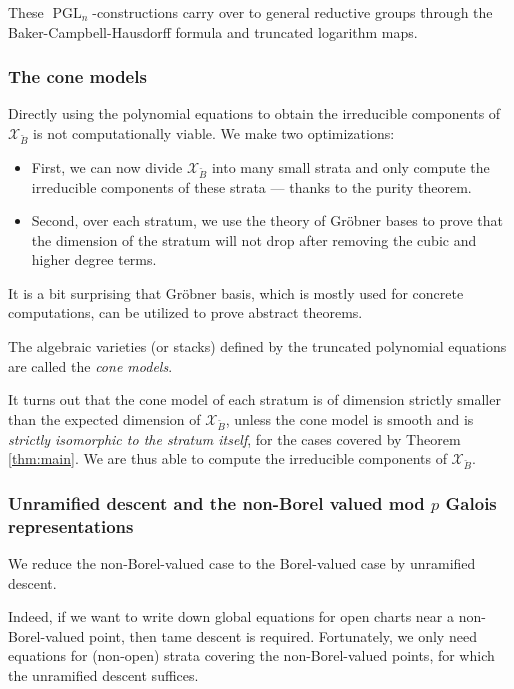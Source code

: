 \documentclass[11pt]{amsart}
\newcommand{\MINOREDITED}[1]{#1}
\theoremstyle{definition}
\newcommand{\cX}{\mathcal{X}}
\newcommand{\bB}{\breve{B}}
\DeclareMathOperator{\PGL}{PGL}
\begin{document}
These $\PGL_n$-constructions carry over \MINOREDITED{to} general reductive groups
through the Baker-Campbell-Hausdorff formula
and truncated logarithm maps.

\subsubsection{The cone models}
Directly using the polynomial equations to
obtain the irreducible components of $\cX_{\bB}$
is not computationally viable.
We make two optimizations:
\begin{itemize}
\item 
First,
we can now divide $\cX_{\bB}$
into many small strata
and only compute the irreducible components
of these strata ---
thanks to the purity theorem.
\item
Second, over each stratum,
we use the theory of Gr\"obner \MINOREDITED{bases}
to prove that the dimension of the stratum
will not drop after removing the cubic and higher degree terms.
\end{itemize}

\noindent
It is a bit surprising that Gr\"obner basis,
which is mostly used for concrete computations,
can be utilized to prove abstract theorems.


The algebraic varieties (or stacks) defined by the truncated
polynomial equations are called the {\it cone models}.


It turns out that the cone model
of each stratum is
of dimension strictly smaller than
the expected dimension of $\cX_{\bB}$,
unless the cone model is smooth
and
is {\it strictly isomorphic to the stratum itself},
for the cases covered by Theorem \ref{thm:main}.
We are thus able to compute the irreducible components
of $\cX_{\bB}$.


\subsubsection{Unramified descent and the non-Borel valued
mod $p$ Galois representations}

We reduce the non-Borel-valued case
to the Borel-valued case by unramified descent.

Indeed, if we want to write down global equations
for open charts near a non-Borel-valued \MINOREDITED{point},
then tame descent is required.
Fortunately,
we only need equations for (non-open)
strata covering the non-Borel-valued points,
for which the unramified descent suffices.
\end{document}
